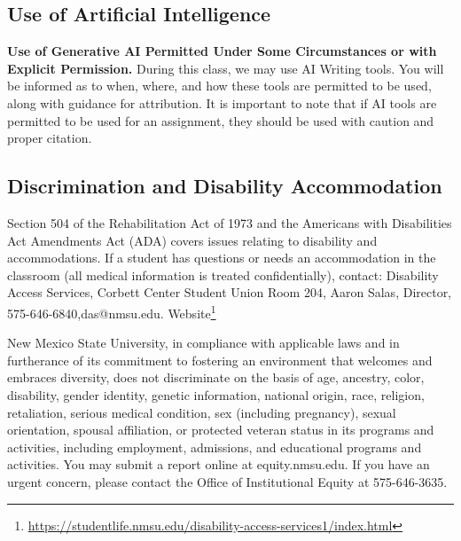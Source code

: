 \documentclass[10pt,letterpaper]{article}
\newcommand{\simplelatexlinkfoot}[2]{\footnote{\href{#2}{#1}}}
\begin{document}
 

\subsection*{Use of Artificial Intelligence}
\textbf{Use of Generative AI Permitted Under Some Circumstances or with Explicit Permission.} During this class, we may use AI Writing tools. You will be informed as to when, where, and how these tools are permitted to be used, along with guidance for attribution. It is important to note that if AI tools are permitted to be used for an assignment, they should be used with caution and proper citation. 

\subsection*{Discrimination and Disability Accommodation}
Section 504 of the Rehabilitation Act of 1973 and the Americans with Disabilities Act Amendments Act (ADA) covers issues relating to disability and accommodations. If a student has questions or needs an accommodation in the classroom (all medical information is treated confidentially), contact:    Disability Access Services, Corbett Center Student Union Room 204, Aaron Salas, Director, 575-646-6840,das@nmsu.edu.  Website\simplelatexlinkfoot{https://studentlife.nmsu.edu/disability-access-services1/index.html}{https://studentlife.nmsu.edu/disability-access-services1/index.html}

New Mexico State University, in compliance with applicable laws and in furtherance of its commitment to fostering an environment that welcomes and embraces diversity, does not discriminate on the basis of age, ancestry, color, disability, gender identity, genetic information, national origin, race, religion, retaliation, serious medical condition, sex (including pregnancy), sexual orientation, spousal affiliation, or protected veteran status in its programs and activities, including employment, admissions, and educational programs and activities. You may submit a report online at equity.nmsu.edu. If you have an urgent concern, please contact the Office of Institutional Equity at 575-646-3635.
\end{document}
